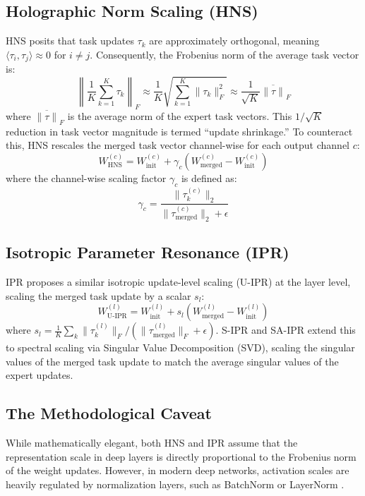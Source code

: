 \documentclass{article}
\begin{document}
\subsection{Holographic Norm Scaling (HNS)}
HNS \cite{submission7} posits that task updates $\tau_k$ are approximately orthogonal, meaning $\langle \tau_i, \tau_j \rangle \approx 0$ for $i \neq j$. Consequently, the Frobenius norm of the average task vector is:
\begin{equation}
\left\| \frac{1}{K} \sum_{k=1}^K \tau_k \right\|_F \approx \frac{1}{K} \sqrt{ \sum_{k=1}^K \|\tau_k\|_F^2 } \approx \frac{1}{\sqrt{K}} \overline{\|\tau\|}_F
\end{equation}
where $\overline{\|\tau\|}_F$ is the average norm of the expert task vectors. This $1/\sqrt{K}$ reduction in task vector magnitude is termed ``update shrinkage.'' To counteract this, HNS rescales the merged task vector channel-wise for each output channel $c$:
\begin{equation}
W_{\text{HNS}}^{(c)} = W_{\text{init}}^{(c)} + \gamma_c \left( W_{\text{merged}}^{(c)} - W_{\text{init}}^{(c)} \right)
\end{equation}
where the channel-wise scaling factor $\gamma_c$ is defined as:
\begin{equation}
\gamma_c = \frac{\| \tau_k^{(c)} \|_2}{\| \tau_{\text{merged}}^{(c)} \|_2 + \epsilon}
\end{equation}

\subsection{Isotropic Parameter Resonance (IPR)}
IPR \cite{submission9} proposes a similar isotropic update-level scaling (U-IPR) at the layer level, scaling the merged task update by a scalar $s_l$:
\begin{equation}
W_{\text{U-IPR}}^{(l)} = W_{\text{init}}^{(l)} + s_l \left( W_{\text{merged}}^{(l)} - W_{\text{init}}^{(l)} \right)
\end{equation}
where $s_l = \frac{1}{K} \sum_k \|\tau_k^{(l)}\|_F / (\|\tau_{\text{merged}}^{(l)}\|_F + \epsilon)$.
S-IPR and SA-IPR extend this to spectral scaling via Singular Value Decomposition (SVD), scaling the singular values of the merged task update to match the average singular values of the expert updates.

\subsection{The Methodological Caveat}
While mathematically elegant, both HNS and IPR assume that the representation scale in deep layers is directly proportional to the Frobenius norm of the weight updates. However, in modern deep networks, activation scales are heavily regulated by normalization layers, such as BatchNorm \cite{ioffe2015batch} or LayerNorm \cite{ba2016layer}. 
\end{document}
